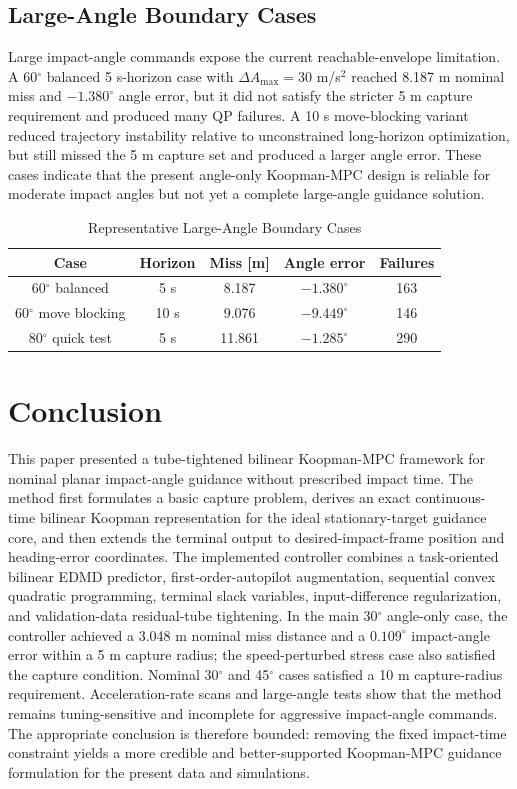 \documentclass[letterpaper,journal]{IEEEtran}
\begin{document}
\subsection{Large-Angle Boundary Cases}
Large impact-angle commands expose the current reachable-envelope limitation. A 60$^\circ$ balanced 5 s-horizon case with $\Delta A_{\max}=30$ m/s$^2$ reached 8.187 m nominal miss and $-1.380^\circ$ angle error, but it did not satisfy the stricter 5 m capture requirement and produced many QP failures. A 10 s move-blocking variant reduced trajectory instability relative to unconstrained long-horizon optimization, but still missed the 5 m capture set and produced a larger angle error. These cases indicate that the present angle-only Koopman-MPC design is reliable for moderate impact angles but not yet a complete large-angle guidance solution.

\begin{table}[!t]
\caption{Representative Large-Angle Boundary Cases}
\label{tab:large_angle_boundary}
\centering
\footnotesize
\begin{tabular}{c c c c c}
\hline
Case & Horizon & Miss [m] & Angle error & Failures\\
\hline
60$^\circ$ balanced & 5 s & 8.187 & $-1.380^\circ$ & 163\\
60$^\circ$ move blocking & 10 s & 9.076 & $-9.449^\circ$ & 146\\
80$^\circ$ quick test & 5 s & 11.861 & $-1.285^\circ$ & 290\\
\hline
\end{tabular}
\end{table}

\section{Conclusion}
This paper presented a tube-tightened bilinear Koopman-MPC framework for nominal planar impact-angle guidance without prescribed impact time. The method first formulates a basic capture problem, derives an exact continuous-time bilinear Koopman representation for the ideal stationary-target guidance core, and then extends the terminal output to desired-impact-frame position and heading-error coordinates. The implemented controller combines a task-oriented bilinear EDMD predictor, first-order-autopilot augmentation, sequential convex quadratic programming, terminal slack variables, input-difference regularization, and validation-data residual-tube tightening. In the main 30$^\circ$ angle-only case, the controller achieved a 3.048 m nominal miss distance and a $0.109^\circ$ impact-angle error within a 5 m capture radius; the speed-perturbed stress case also satisfied the capture condition. Nominal 30$^\circ$ and 45$^\circ$ cases satisfied a 10 m capture-radius requirement. Acceleration-rate scans and large-angle tests show that the method remains tuning-sensitive and incomplete for aggressive impact-angle commands. The appropriate conclusion is therefore bounded: removing the fixed impact-time constraint yields a more credible and better-supported Koopman-MPC guidance formulation for the present data and simulations.
\end{document}
